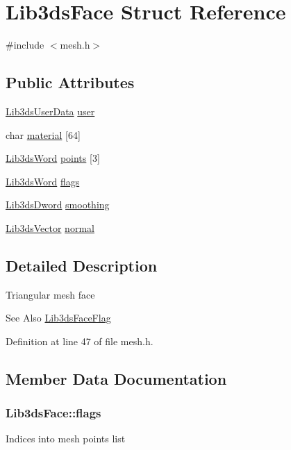\hypertarget{struct_lib3ds_face}{\section{Lib3ds\-Face Struct Reference}
\label{struct_lib3ds_face}
}


{\ttfamily \#include $<$mesh.\-h$>$}

\subsection*{Public Attributes}
\begin{DoxyCompactItemize}
\item 
\hyperlink{union_lib3ds_user_data}{Lib3ds\-User\-Data} \hyperlink{struct_lib3ds_face_a06c51e3d62d2d2ded596fb53cfe49316}{user}
\item 
char \hyperlink{struct_lib3ds_face_a90a36b5382746728de75494e8a3f923b}{material} \mbox{[}64\mbox{]}
\item 
\hyperlink{types_8h_a439f68d12f4ad080599044949e41dba1}{Lib3ds\-Word} \hyperlink{struct_lib3ds_face_a8442b94dd05fb4825de5b8eafcb32d57}{points} \mbox{[}3\mbox{]}
\item 
\hyperlink{types_8h_a439f68d12f4ad080599044949e41dba1}{Lib3ds\-Word} \hyperlink{struct_lib3ds_face_a31c3fc185156ab83b17ca85b15d408c6}{flags}
\item 
\hyperlink{types_8h_a299c9663303144c562f6bd92c2f273d3}{Lib3ds\-Dword} \hyperlink{struct_lib3ds_face_afcaec6a7c5f1cdcf3949c28ca8de3ddc}{smoothing}
\item 
\hyperlink{group__vector_ga6ac1c3b3ef15381ebf6baf264d658dcf}{Lib3ds\-Vector} \hyperlink{struct_lib3ds_face_a6a161cba0c8e3fed5799fac0126fe8c3}{normal}
\end{DoxyCompactItemize}


\subsection{Detailed Description}
Triangular mesh face

\begin{DoxySeeAlso}{See Also}
\hyperlink{mesh_8h_ae39baeb87be5b82c5990966453f24b25}{Lib3ds\-Face\-Flag} 
\end{DoxySeeAlso}


Definition at line 47 of file mesh.\-h.



\subsection{Member Data Documentation}
\hypertarget{struct_lib3ds_face_a31c3fc185156ab83b17ca85b15d408c6}{
\subsubsection[{flags}]{ Lib3ds\-Face\-::flags}}\label{struct_lib3ds_face_a31c3fc185156ab83b17ca85b15d408c6}
Indices into mesh points list 

